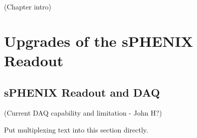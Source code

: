 (Chapter intro)

\chapter{Upgrades of the sPHENIX Readout}
\label{chap:readout}

\section{sPHENIX Readout and DAQ}
\label{sec:streaming_readout}

(Current DAQ capability and limitation - John H?)



Put multiplexing text into this section directly.